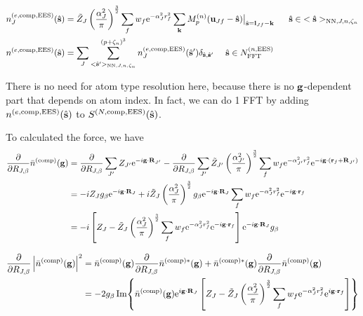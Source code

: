 \documentclass[paper=a4, fontsize=11pt]{article} %
\numberwithin{equation}{section} %
\numberwithin{figure}{section} %
\numberwithin{table}{section} %
\newcommand{\p}{\partial}
\newcommand{\bu}{{\bf{u}}}
\newcommand{\bl}{{\bf{l}}}
\newcommand{\bk}{{\bf{k}}}
\newcommand{\bs}{{\bf{s}}}
\newcommand{\bg}{{\bf{g}}}
\newcommand{\br}{{\bf{r}}}
\newcommand{\bR}{{\bf{R}}}
\newcommand{\hs}{{\hat{\bf{s}}}}
\newcommand{\rEES}{{\mathrm{EES}}}
\newcommand{\rNN}{{\mathrm{NN}}}
\newcommand{\re}{{\mathrm{e}}}
\newcommand{\rcomp}{{\mathrm{comp}}}
\newcommand{\ibgR}{i\bg\cdot\bR}
\newcommand{\al}{{\alpha}}
\newcommand{\RJb}{{R_{J,\beta}}}
\newcommand{\NFFTnEES}{{N^{(n,\rEES)}_{\mathrm{FFT}}}}
\newcommand{\pzn}{{(p+\zeta_n)^3}}
\newcommand{\hsJn}{{<\hs>_{\rNN,J,n,\zeta_n}}}
\newcommand{\hsinJn}{{\ \ \ \ \ \hs  \in  \hsJn}}
\newcommand{\hspJn}{{<\hs'>_{\rNN,J,n,\zeta_n}}}
\newcommand{\hsinnEES}{{\ \ \ \ \hs \in \NFFTnEES}}
\begin{document}
\begin{equation}
\begin{split}
n_J^{(e,\rcomp,\rEES)}(\hs) &=\tilde Z_J \left(\frac{\al_J^2}{\pi}\right)^{\frac{3}{2}}\sum_f w_f  \re^{-\al_J^2 r_f^2}\sum_{\bk}  M_p^{(n)}(\bu_{Jf}-\hat \bs)\big|_{\hs=\bl_{Jf}-\bk} \hsinJn\\
n^{(e,\rcomp,\rEES)}(\hs) &= \sum_J \sum_{\hspJn}^{\pzn} n_J^{(e,\rcomp,\rEES)}(\hs') \delta_{\hs,\hs'} \hsinnEES
\end{split}
\end{equation}

There is no need for atom type resolution here, because there is no $\bg$-dependent part that depends on atom index. In fact, we can do 1 FFT by adding $n^{(e,\rcomp,\rEES)}(\hs)$ to $S^{(N,\rcomp,\rEES)}(\hs)$.

To calculated the force, we have
\begin{equation}
\begin{split}
\frac{\p}{\p \RJb} \bar n ^{(\rcomp)}(\bg)
&= \frac{\p}{\p \RJb} \sum_{J'} Z_{J'} \re^{-\ibgR_{J'}} -  \frac{\p}{\p \RJb} \sum_{J'} \tilde Z_{J'} \left(\frac{\al_{J'}^2}{\pi}\right)^{\frac{3}{2}} \sum_f w_f \re^{-\al_{J'}^2 r_f^2} \re^{-i\bg\cdot\left(\br_f+\bR_{J'}\right)}\\
&= -iZ_J g_{\beta} \re^{-\ibgR_{J}} + i\tilde Z_J \left(\frac{\al_{J}^2}{\pi}\right)^{\frac{3}{2}} g_{\beta} \re^{-\ibgR_{J}} \sum_f w_f \re^{-\al_{J}^2 r_f^2}\re^{-i\bg\cdot \br_f }\\
&= -i\left[Z_J - \tilde Z_J  \left(\frac{\al_{J}^2}{\pi}\right)^{\frac{3}{2}}\sum_f w_f \re^{-\al_{J}^2 r_f^2}\re^{-i\bg\cdot \br_f }\right]\re^{-\ibgR_{J}}g_{\beta}
\end{split}
\end{equation}

\begin{equation}
\begin{split}
\frac{\p}{\p \RJb}\left|\bar n ^{(\rcomp)}(\bg)\right|^2
&= \bar n ^{(\rcomp)}(\bg) \frac{\p}{\p \RJb}  \bar n ^{(\rcomp)*}(\bg) + \bar n ^{(\rcomp)*}(\bg) \frac{\p}{\p \RJb}  \bar n ^{(\rcomp)}(\bg) \\
&= -2 g_{\beta}\Im{\bar n ^{(\rcomp)}(\bg) \re^{\ibgR_{J}}\left[Z_J - \tilde Z_J \left(\frac{\al_{J}^2}{\pi}\right)^{\frac{3}{2}}\sum_f w_f \re^{-\al_{J}^2 r_f^2}\re^{i\bg\cdot \br_f }\right]} 
\end{split}
\end{equation}
\end{document}
